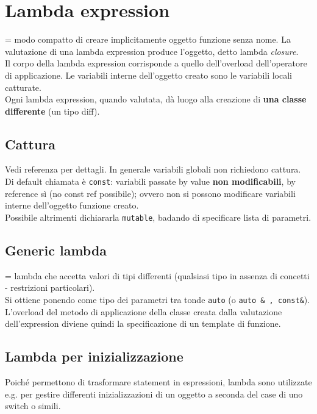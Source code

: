 \documentclass[10pt, oneside]{book}
\begin{document}
\section{Lambda expression}
= modo compatto di creare implicitamente oggetto funzione senza nome. La valutazione di una lambda expression produce l'oggetto, detto lambda \textit{closure}.\\
Il corpo della lambda expression corrisponde a quello dell'overload dell'operatore di applicazione. Le variabili interne dell'oggetto creato sono le variabili locali catturate.\\
Ogni lambda expression, quando valutata, dà luogo alla creazione di \textbf{una classe differente} (un tipo diff).

\subsection{Cattura}
Vedi referenza per dettagli. In generale variabili globali non richiedono cattura.
Di default chiamata è \texttt{const}: variabili passate by value \textbf{non modificabili}, by reference sì (no const ref possibile); ovvero non si possono modificare variabili interne dell'oggetto funzione creato.\\
Possibile altrimenti dichiararla \texttt{mutable}, badando di specificare lista di parametri.

\subsection{Generic lambda}
= lambda che accetta valori di tipi differenti (qualsiasi tipo in assenza di concetti - restrizioni particolari).\\
Si ottiene ponendo come tipo dei parametri tra tonde \texttt{auto} (o \texttt{auto \& , const\&}). L'overload del metodo di applicazione della classe creata dalla valutazione dell'expression diviene quindi la specificazione di un template di funzione.

\subsection{Lambda per inizializzazione}
Poiché permettono di trasformare statement in espressioni, lambda sono utilizzate e.g. per gestire differenti inizializzazioni di un oggetto a seconda del case di uno switch o simili. 
\end{document}
